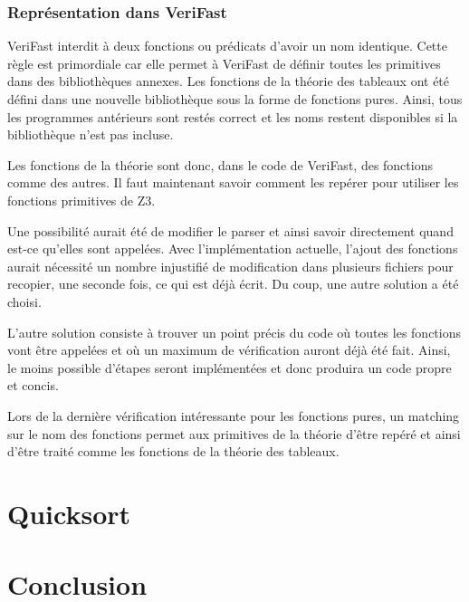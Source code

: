 \documentclass[9pt]{book}
\newcommand{\verifast}{VeriFast}
\begin{document}
		\subsection{Repr\'esentation dans \verifast{}}
		\verifast{} interdit \`a deux fonctions ou pr\'edicats d'avoir un nom identique. Cette r\`egle est primordiale car elle permet \`a \verifast{} de d\'efinir toutes les primitives dans des biblioth\`eques annexes. Les fonctions de la th\'eorie des tableaux ont \'et\'e d\'efini dans une nouvelle biblioth\`eque sous la forme de fonctions pures. Ainsi, tous les programmes ant\'erieurs sont rest\'es correct et les noms restent disponibles si la biblioth\`eque n'est pas incluse.\par
		Les fonctions de la th\'eorie sont donc, dans le code de \verifast{}, des fonctions comme des autres. Il faut maintenant savoir comment les rep\'erer pour utiliser les fonctions primitives de Z3. \par
		Une possibilit\'e aurait \'et\'e de modifier le parser et ainsi savoir directement quand est-ce qu'elles sont appel\'ees. Avec l'impl\'ementation actuelle, l'ajout des fonctions aurait n\'ecessit\'e un nombre injustifi\'e de modification dans plusieurs fichiers pour recopier, une seconde fois, ce qui est d\'ej\`a \'ecrit. Du coup, une autre solution a \'et\'e choisi. \par
		L'autre solution consiste \`a trouver un point pr\'ecis du code o\`u toutes les fonctions vont \^etre appel\'ees et o\`u un maximum de v\'erification auront d\'ej\`a \'et\'e fait. Ainsi, le moins possible d'\'etapes seront impl\'ement\'ees et donc produira un code propre et concis.\par
		Lors de la derni\`ere v\'erification int\'eressante pour les fonctions pures, un matching sur le nom des fonctions permet aux primitives de la th\'eorie d'\^etre rep\'er\'e et ainsi d'\^etre trait\'e comme les fonctions de la th\'eorie des tableaux.

\chapter{Quicksort}
\chapter{Conclusion}
\tableofcontents
\end{document}
